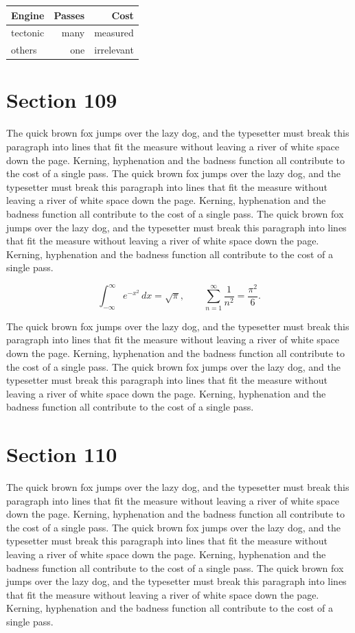 \documentclass{article}
\begin{document}
\begin{center}
\begin{tabular}{lrr}
\toprule
Engine & Passes & Cost \\
\midrule
tectonic & many & measured \\
others & one & irrelevant \\
\bottomrule
\end{tabular}
\end{center}

\section{Section 109}
The quick brown fox jumps over the lazy dog, and the typesetter must break this paragraph into lines that fit the measure without leaving a river of white space down the page. Kerning, hyphenation and the badness function all contribute to the cost of a single pass. The quick brown fox jumps over the lazy dog, and the typesetter must break this paragraph into lines that fit the measure without leaving a river of white space down the page. Kerning, hyphenation and the badness function all contribute to the cost of a single pass. The quick brown fox jumps over the lazy dog, and the typesetter must break this paragraph into lines that fit the measure without leaving a river of white space down the page. Kerning, hyphenation and the badness function all contribute to the cost of a single pass. 

\begin{equation}
\int_{-\infty}^{\infty} e^{-x^{2}}\,dx = \sqrt{\pi}, \qquad
\sum_{n=1}^{\infty} \frac{1}{n^{2}} = \frac{\pi^{2}}{6}.
\end{equation}

The quick brown fox jumps over the lazy dog, and the typesetter must break this paragraph into lines that fit the measure without leaving a river of white space down the page. Kerning, hyphenation and the badness function all contribute to the cost of a single pass. The quick brown fox jumps over the lazy dog, and the typesetter must break this paragraph into lines that fit the measure without leaving a river of white space down the page. Kerning, hyphenation and the badness function all contribute to the cost of a single pass. 
\section{Section 110}
The quick brown fox jumps over the lazy dog, and the typesetter must break this paragraph into lines that fit the measure without leaving a river of white space down the page. Kerning, hyphenation and the badness function all contribute to the cost of a single pass. The quick brown fox jumps over the lazy dog, and the typesetter must break this paragraph into lines that fit the measure without leaving a river of white space down the page. Kerning, hyphenation and the badness function all contribute to the cost of a single pass. The quick brown fox jumps over the lazy dog, and the typesetter must break this paragraph into lines that fit the measure without leaving a river of white space down the page. Kerning, hyphenation and the badness function all contribute to the cost of a single pass. 
\end{document}
